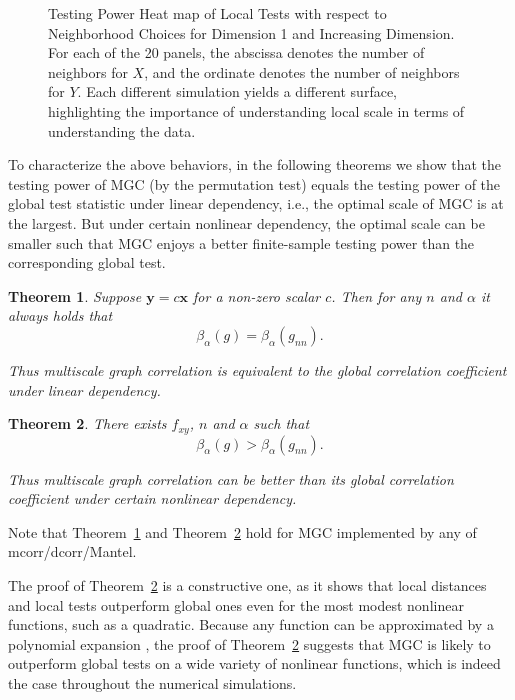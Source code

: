 \documentclass[11pt]{article}
\providecommand{\mb}[1]{\boldsymbol{#1}}
\newtheorem{thm}{Theorem}
\begin{document}
\begin{figure}[htbp]
{}
\caption{Testing Power Heat map of Local Tests with respect to Neighborhood Choices for Dimension 1 and Increasing Dimension.
For each of the 20 panels, the abscissa denotes the number of neighbors for $X$, and the ordinate denotes the number of neighbors for $Y$.  Each different simulation yields a different surface, highlighting the importance of understanding local scale in terms of understanding the data.}
\label{figSim2}
\end{figure}

To characterize the above behaviors, in the following theorems we show that the testing power of MGC (by the permutation test) equals the testing power of the global test statistic under linear dependency, i.e., the optimal scale of MGC is at the largest. But under certain nonlinear dependency, the optimal scale can be smaller such that MGC enjoys a better finite-sample testing power than the corresponding global test. 

\begin{thm}
\label{thm2}
Suppose $\mb{y}=c\mb{x}$ for a non-zero scalar $c$. Then for any $n$ and $\alpha$ it always holds that
\begin{equation}
\beta_{\alpha}(g) = \beta_{\alpha}(g_{nn}).
\end{equation}

Thus multiscale graph correlation is equivalent to the global correlation coefficient under linear dependency.
\end{thm}

\begin{thm}
\label{thm3}
There exists $f_{xy}$, $n$ and $\alpha$ such that 
\begin{equation}
\beta_{\alpha}(g) > \beta_{\alpha}(g_{nn}).
\end{equation}

Thus multiscale graph correlation can be better than its global correlation coefficient under certain nonlinear dependency.
\end{thm}
Note that Theorem~\ref{thm2} and Theorem~\ref{thm3} hold for MGC implemented by any of mcorr/dcorr/Mantel.

The proof of Theorem~\ref{thm3} is a constructive one, as it shows that local distances and local tests outperform global ones even for the most modest nonlinear functions, such as a quadratic.  Because any function can be approximated by a polynomial expansion \cite{RudinBook}, the proof of Theorem~\ref{thm3} suggests that MGC is likely to outperform global tests on a wide variety of nonlinear functions, which is indeed the case throughout the numerical simulations.
\end{document}
